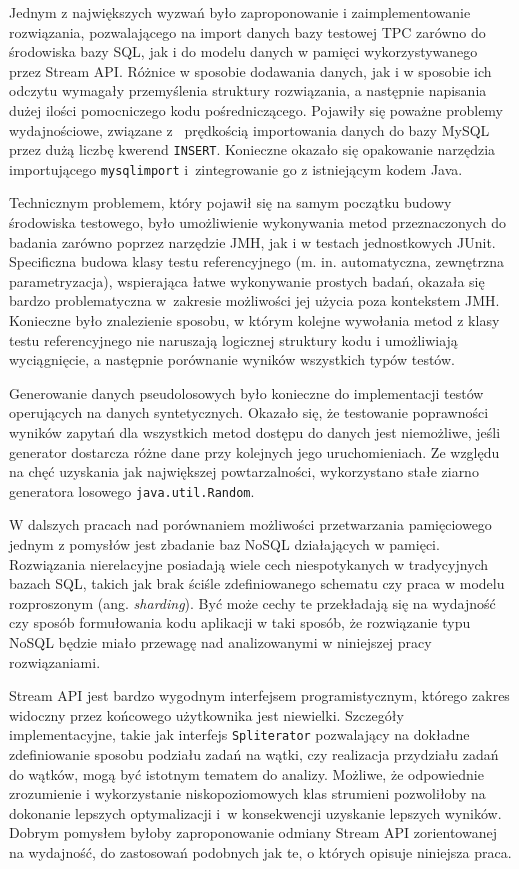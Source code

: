 \documentclass[12pt,twoside,openright]{extarticle}
\begin{document}
    Jednym z największych wyzwań było zaproponowanie i zaimplementowanie rozwiązania, pozwalającego na import danych bazy testowej TPC zarówno do środowiska bazy SQL, jak i do modelu danych w pamięci wykorzystywanego przez Stream API. Różnice w sposobie dodawania danych, jak i w sposobie ich odczytu wymagały przemyślenia struktury rozwiązania, a następnie napisania dużej ilości pomocniczego kodu pośredniczącego. Pojawiły się poważne problemy wydajnościowe, związane z~ prędkością importowania danych do bazy MySQL przez dużą liczbę kwerend \texttt{INSERT}. Konieczne okazało się opakowanie narzędzia importującego \texttt{mysqlimport} i~zintegrowanie go z istniejącym kodem Java.

    Technicznym problemem, który pojawił się na samym początku budowy środowiska testowego, było umożliwienie wykonywania metod przeznaczonych do badania zarówno poprzez narzędzie JMH, jak i w testach jednostkowych JUnit. Specificzna budowa klasy testu referencyjnego (m. in. automatyczna, zewnętrzna parametryzacja), wspierająca łatwe wykonywanie prostych badań, okazała się bardzo problematyczna w~zakresie możliwości jej użycia poza kontekstem JMH. Konieczne było znalezienie sposobu, w którym kolejne wywołania metod z klasy testu referencyjnego nie naruszają logicznej struktury kodu i umożliwiają wyciągnięcie, a następnie porównanie wyników wszystkich typów testów.

    Generowanie danych pseudolosowych było konieczne do implementacji testów operujących na danych syntetycznych. Okazało się, że testowanie poprawności wyników zapytań dla wszystkich metod dostępu do danych jest niemożliwe, jeśli generator dostarcza różne dane przy kolejnych jego uruchomieniach. Ze względu na chęć uzyskania jak największej powtarzalności, wykorzystano stałe ziarno generatora losowego \texttt{java.util.Random}.


    W dalszych pracach nad porównaniem możliwości przetwarzania pamięciowego jednym z pomysłów jest zbadanie baz NoSQL działających w pamięci. Rozwiązania nierelacyjne posiadają wiele cech niespotykanych w tradycyjnych bazach SQL, takich jak brak ściśle zdefiniowanego schematu czy praca w modelu rozproszonym (ang. \textit{sharding}). Być może cechy te przekładają się na wydajność czy sposób formułowania kodu aplikacji w taki sposób, że rozwiązanie typu NoSQL będzie miało przewagę nad analizowanymi w niniejszej pracy rozwiązaniami.

    Stream API jest bardzo wygodnym interfejsem programistycznym, którego zakres widoczny przez końcowego użytkownika jest niewielki. Szczegóły implementacyjne, takie jak interfejs \texttt{Spliterator} pozwalający na dokładne zdefiniowanie sposobu podziału zadań na wątki, czy realizacja przydziału zadań do wątków, mogą być istotnym tematem do analizy. Możliwe, że odpowiednie zrozumienie i wykorzystanie niskopoziomowych klas strumieni pozwoliłoby na dokonanie lepszych optymalizacji i~w konsekwencji uzyskanie lepszych wyników. Dobrym pomysłem byłoby zaproponowanie odmiany Stream API zorientowanej na wydajność, do zastosowań podobnych jak te, o których opisuje niniejsza praca.
\end{document}
